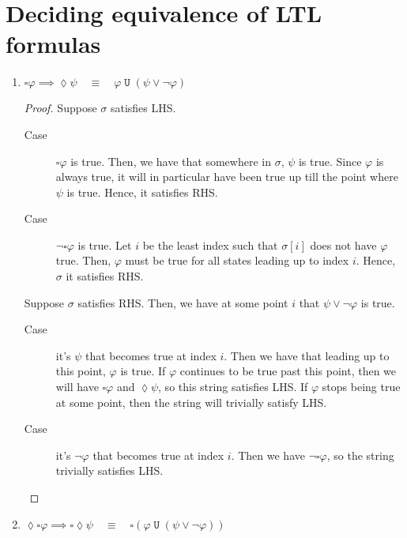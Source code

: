\documentclass[letterpaper,11pt]{article}
\newcommand{\question}{\section}
\newcommand{\eventually}{\lozenge}
\newcommand{\always}{\square}
\DeclareMathOperator{\untilOp}{\mathtt{U}}
\newcommand{\until}{\untilOp{}}
\newcommand{\parens}[1]{\left(#1\right)}
\newcommand{\enumalpha}{\renewcommand\labelenumi{(\alph{enumi})}}
\newcommand{\quadequiv}{\quad \equiv \quad}
\begin{document}
\question{Deciding equivalence of LTL formulas}

\begin{enumerate}
        \enumalpha
    \item
        $
        \always \varphi \implies \eventually \psi
        \quadequiv
        \varphi \until \parens{\psi \lor \neg \varphi}
        $

        \begin{proof}
            Suppose $\sigma$ satisfies LHS.
            \begin{description}
                \item[Case] $\always \varphi$ is true. Then, we have that
                    somewhere in $\sigma$, $\psi$ is true. Since $\varphi$ is
                    always true, it will in particular have been true up till
                    the point where $\psi$ is true. Hence, it satisfies RHS.
                \item[Case] $\neg \always \varphi$ is true. Let $i$ be the
                    least index such that $\sigma[i]$ does not have $\varphi$
                    true. Then, $\varphi$ must be true for all states leading
                    up to index $i$. Hence, $\sigma$ it satisfies RHS.
            \end{description}

            Suppose $\sigma$ satisfies RHS. Then, we have at some point $i$
            that $\psi \lor \neg \varphi$ is true.
            \begin{description}
                \item[Case] it's $\psi$ that becomes true at index $i$. Then we
                    have that leading up to this point, $\varphi$ is true. If
                    $\varphi$ continues to be true past this point, then we
                    will have $\always \varphi$ and $\eventually \psi$, so this
                    string satisfies LHS. If $\varphi$ stops being true at
                    some point, then the string will trivially satisfy LHS.

                \item[Case] it's $\neg \varphi$ that becomes true at index
                    $i$. Then we have $\neg \always \varphi$, so the string
                    trivially satisfies LHS.
            \end{description}
        \end{proof}

    \item
        $
        \eventually \always \varphi \implies \always \eventually \psi
        \quadequiv
        \always\parens{
            \varphi \until \parens{
                \psi \lor \neg \varphi
            }
        }
        $


\end{enumerate}
\end{document}
